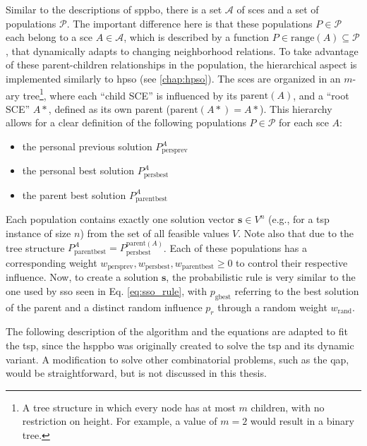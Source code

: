 Similar to the descriptions of \gls{sppbo}, there is a set $\mathcal{A}$ of \glspl{sce} and a set of populations $\mathcal{P}$. The important difference here is that these populations $P \in \mathcal{P}$ each belong to a \gls{sce} $A \in \mathcal{A}$, which is described by a function $P\in \text{range}(A) \subseteq \mathcal{P}$, that dynamically adapts to changing neighborhood relations. To take advantage of these parent-children relationships in the population, the hierarchical aspect is implemented similarly to \gls{hpso} (see \cref{chap:hpso}). The \glspl{sce} are organized in an $m$-ary tree\footnote{A tree structure in which every node has at most $m$ children, with no restriction on height. For example, a value of $m=2$ would result in a binary tree.}, where each \enquote{child SCE} is influenced by its $\text{parent}(A)$, and a \enquote{root SCE} $A*$, defined as its own parent ($\text{parent}(A*) = A*$). This hierarchy allows for a clear definition of the following populations $P\in \mathcal{P}$ for each \gls{sce} $A$:
\begin{itemize}
	\item the personal previous solution $P^{A}_{\text{persprev}}$
	\item the personal best solution $P^{A}_{\text{persbest}}$
	\item the parent best solution $P^{A}_{\text{parentbest}}$
\end{itemize}
Each population contains exactly one solution vector $\mathbf{s} \in V^n$ (e.g., for a \gls{tsp} instance of size $n$) from the set of all feasible values $V$. Note also that due to the tree structure $P^{A}_{\text{parentbest}} = P^{\text{parent}(A)}_{\text{persbest}}$. Each of these populations has a corresponding weight $w_{\text{persprev}}, w_{\text{persbest}}, w_{\text{parentbest}} \geq 0$ to control their respective influence. 
Now, to create a solution $\mathbf{s}$, the probabilistic rule is very similar to the one used by \gls{sso} seen in Eq. \eqref{eq:sso_rule}, with $p_{\text{gbest}}$ referring to the best solution of the parent and a distinct random influence $p_r$ through a random weight $w_\text{rand}$.

The following description of the algorithm and the equations are adapted to fit the \gls{tsp}, since the \gls{hsppbo} was originally created to solve the \gls{tsp} and its dynamic variant. A modification to solve other combinatorial problems, such as the \gls{qap}, would be straightforward, but is not discussed in this thesis.

